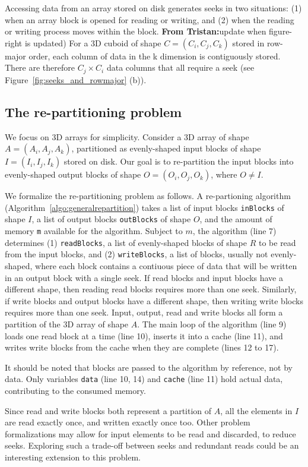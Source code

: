 \documentclass[sigconf, nonacm]{acmart}
\newcommand{\tristan}[1]{\color{orange}\textbf{From Tristan:}#1\color{black}}
\begin{document}
Accessing data from an array stored on disk generates seeks in two
situations: (1) when an array block is opened for reading or writing, and (2)
when the reading or writing process moves within the block. 
\tristan{update when figure-right is updated) For a 3D cuboid of shape $C = (C_i, C_j, C_k)$ stored
in row-major order, each column of data in the k dimension is contiguously
stored. There are therefore $C_j \times C_i$ data columns that all require a
seek (see Figure~\ref{fig:seeks_and_rowmajor} (b)).

\subsection{The re-partitioning problem}
We focus on 3D arrays for simplicity. Consider a 3D array of shape $A =
(A_i, A_j, A_k)$, partitioned as evenly-shaped input blocks of shape $I = (I_i,
I_j, I_k)$ stored on disk. Our goal is to re-partition the input blocks into
evenly-shaped output blocks of shape $O = (O_i, O_j, O_k)$, where $O \neq I$.

We formalize the re-partitioning problem as follows.
A re-partioning algorithm (Algorithm~\ref{algo:generalrepartition}) takes a
list of input blocks \texttt{inBlocks} of shape $I$, a list of output
blocks \texttt{outBlocks} of shape $O$, and the amount of memory \texttt{m}
available for the algorithm. Subject to $m$, the algorithm (line 7) determines (1)
\texttt{readBlocks}, a list of evenly-shaped blocks of shape $R$ to be read from the
input blocks, and (2) \texttt{writeBlocks}, a list of blocks,
usually not evenly-shaped, where each block contains a contiuous piece of
data that will be written in an output block with a single seek.
If read blocks and input blocks have a different shape, then reading read blocks requires
more than one seek. Similarly, if write blocks and output blocks have a different shape,
then writing write blocks requires more than one seek. Input, output, read
and write blocks all form a partition of the 3D array of shape $A$. The
main loop of the algorithm (line 9) loads one read block at a time (line
10), inserts it into a cache (line 11), and writes write blocks from the
cache when they are complete (lines 12 to 17).

It should be noted that blocks are passed to the algorithm by reference,
not by data. Only variables \texttt{data} (line 10, 14) and \texttt{cache}
(line 11) hold actual data, contributing to the consumed memory. 

Since read and write blocks both represent a partition of $A$, all the
elements in $I$ are read exactly once, and written exactly once too. Other
problem formalizations may allow for input elements to be read and
discarded, to reduce seeks. Exploring such a trade-off
between seeks and redundant reads could be an interesting extension to this problem.

}
\end{document}
